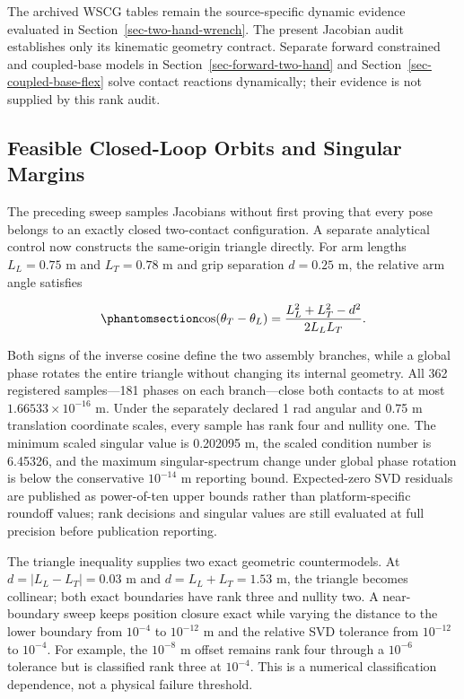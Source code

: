 \documentclass[
  letterpaper,
]{report}
\begin{document}
The archived WSCG tables remain the source-specific dynamic evidence
evaluated in Section~\ref{sec-two-hand-wrench}. The present Jacobian
audit establishes only its kinematic geometry contract. Separate forward
constrained and coupled-base models in
Section~\ref{sec-forward-two-hand} and
Section~\ref{sec-coupled-base-flex} solve contact reactions dynamically;
their evidence is not supplied by this rank audit.

\subsection{Feasible Closed-Loop Orbits and Singular
Margins}\label{sec-ladder-feasible-closure}

The preceding sweep samples Jacobians without first proving that every
pose belongs to an exactly closed two-contact configuration. A separate
analytical control now constructs the same-origin triangle directly. For
arm lengths \(L_L=0.75\) m and \(L_T=0.78\) m and grip separation
\(d=0.25\) m, the relative arm angle satisfies

\begin{equation}\phantomsection\label{eq-ladder-exact-triangle}{
\cos(\theta_T-\theta_L)=
\frac{L_L^2+L_T^2-d^2}{2L_LL_T}.
}\end{equation}

Both signs of the inverse cosine define the two assembly branches, while
a global phase rotates the entire triangle without changing its internal
geometry. All 362 registered samples---181 phases on each branch---close
both contacts to at most \(1.66533\times10^{-16}\) m. Under the
separately declared 1 rad angular and 0.75 m translation coordinate
scales, every sample has rank four and nullity one. The minimum scaled
singular value is 0.202095 m, the scaled condition number is 6.45326,
and the maximum singular-spectrum change under global phase rotation is
below the conservative \(10^{-14}\) m reporting bound. Expected-zero SVD
residuals are published as power-of-ten upper bounds rather than
platform-specific roundoff values; rank decisions and singular values
are still evaluated at full precision before publication reporting.

The triangle inequality supplies two exact geometric countermodels. At
\(d=|L_L-L_T|=0.03\) m and \(d=L_L+L_T=1.53\) m, the triangle becomes
collinear; both exact boundaries have rank three and nullity two. A
near-boundary sweep keeps position closure exact while varying the
distance to the lower boundary from \(10^{-4}\) to \(10^{-12}\) m and
the relative SVD tolerance from \(10^{-12}\) to \(10^{-4}\). For
example, the \(10^{-8}\) m offset remains rank four through a
\(10^{-6}\) tolerance but is classified rank three at \(10^{-4}\). This
is a numerical classification dependence, not a physical failure
threshold.
\end{document}

